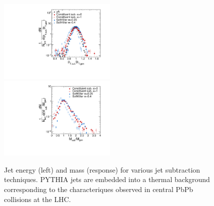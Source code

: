 \begin{figure}[h!]
\centering
\includegraphics[width=0.5\textwidth]{figures/bkgMethods/JetPtResponseMethods.pdf}%
\includegraphics[width=0.5\textwidth]{figures/bkgMethods/JetMassResponseMethods.pdf}%
\caption{Jet energy (left) and mass (response) for various jet subtraction techniques. PYTHIA jets are embedded into a thermal background corresponding to the characteriques observed in central PbPb collisions at the LHC.}
\label{fig:ResponseMethods}
\end{figure}
